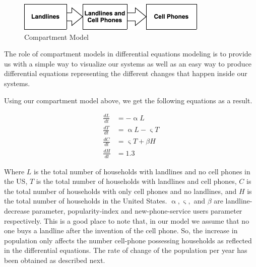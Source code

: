 \documentclass{article}
\begin{document}
\begin{figure}
    \centering
    \includegraphics[width=\textwidth]{compartment.png} 
    \caption{Compartment Model}
    \label{9}
\end{figure}

The role of compartment models in differential equations modeling is to provide us with a simple way to visualize our systems as well as an easy way to produce differential equations representing the different changes that happen inside our systems. \par 

Using our compartment model above, we get the following equations as a result.

\begin{align*}
    \frac{dL}{dt}  &= -\upalpha L \\
    \frac{dT}{dt}  &= \upalpha L - \upvarsigma T \\
    \frac{dC}{dt}  &= \upvarsigma T + \beta H\\
    \frac{dH}{dt}  &= 1.3 
\end{align*}



Where $L$ is the total number of households with landlines and no cell phones in the US, $T$ is the total number of households with landlines and cell phones, $C$ is the total number of households with only cell phones and no landlines, and $H$ is the total number of households in the United States. $\upalpha, \upvarsigma, $ and $\beta$ are landline-decrease parameter, popularity-index and new-phone-service users parameter respectively. This is a good place to note that, in our model we assume that no one buys a landline after the invention of the cell phone. So, the increase in population only affects the number cell-phone possessing households as reflected in the differential equations. The rate of change of the population per year has been obtained as described next.\par 
\end{document}
